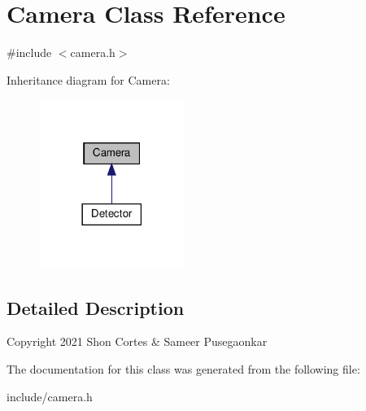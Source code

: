 \hypertarget{classCamera}{}\section{Camera Class Reference}
\label{classCamera}


{\ttfamily \#include $<$camera.\+h$>$}



Inheritance diagram for Camera\+:
\nopagebreak
\begin{figure}[H]
\begin{center}
\leavevmode
\includegraphics[width=134pt]{classCamera__inherit__graph}
\end{center}
\end{figure}


\subsection{Detailed Description}
Copyright 2021  Shon Cortes \& Sameer Pusegaonkar 

The documentation for this class was generated from the following file\+:\begin{DoxyCompactItemize}
\item 
include/camera.\+h\end{DoxyCompactItemize}
